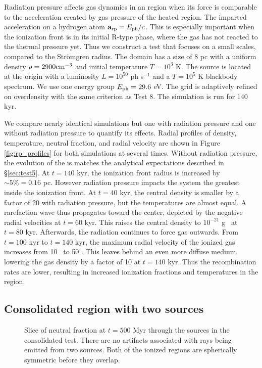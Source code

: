\documentclass[apj,onecolumn]{emulateapj}
\begin{document}
Radiation pressure affects gas dynamics in an  region when
its force is comparable to the acceleration created by gas pressure of
the heated region.  The imparted acceleration on a hydrogen atom
$\mathbf{a}_{\rm rp} = E_{\rm ph}/c$.  This is especially important
when the ionization front is in its initial R-type phase, where the
gas has not reacted to the thermal pressure yet.  Thus we construct a
test that focuses on a small scales, compared to the Str\"{o}mgren
radius.  The domain has a size of 8 pc with a uniform density $\rho =
2900 \cubecm$ and initial temperature $T = 10^3$ K.  The source is
located at the origin with a luminosity $L = 10^{50}$ ph s$^{-1}$ and
a $T=10^5$ K blackbody spectrum.  We use one energy group $E_{\rm ph}
= 29.6$ eV.  The grid is adaptively refined on overdensity with the
same criterion as Test 8.  The simulation is run for 140 kyr.

We compare nearly identical simulations but one with radiation
pressure and one without radiation pressure to quantify its effects.
Radial profiles of density, temperature, neutral fraction, and radial
velocity are shown in Figure \ref{fig:rp_profiles} for both
simulations at several times.  Without radiation pressure, the
evolution of the  is matches the analytical expectations
described in \S\ref{sec:test5}.  At $t=140$ kyr, the ionization front
radius is increased by $\sim5\% = 0.16$ pc.  However radiation
pressure impacts the system the greatest inside the ionization front.
At $t = 40$ kyr, the central density is smaller by a factor of 20 with
radiation pressure, but the temperatures are almost equal.  A
rarefaction wave thus propagates toward the center, depicted by the
negative radial velocities at $t = 60$ kyr.  This raises the central
density to $10^{-21}$ g \cubecm~at $t = 80$ kyr.  Afterwards, the
radiation continues to force gas outwards.  From $t = 100$ kyr to $t =
140$ kyr, the maximum radial velocity of the ionized gas increases
from 10 \kms~to 50 \kms.  This leaves behind an even more diffuse
medium, lowering the gas density by a factor of 10 at $t = 140$ kyr.
Thus the recombination rates are lower, resulting in increased
ionization fractions and temperatures in the  region.

\subsection{Consolidated  region with two sources}

\begin{figure}[t]
  \caption{\label{fig:twosrc} Slice of neutral fraction at $t = 500$
    Myr through the sources in the consolidated  test.
    There are no artifacts associated with rays being emitted from two
    sources.  Both of the ionized regions are spherically symmetric
    before they overlap.}
\end{figure}
\end{document}
